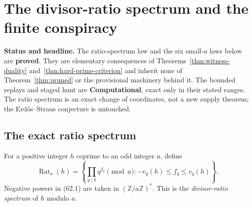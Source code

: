 \documentclass[10pt,reqno]{amsart}
\theoremstyle{definition}
\newcommand{\1}{\mathbf 1}
\begin{document}
\section{The divisor-ratio spectrum and the finite conspiracy}
\label{sec:ratio-spectrum}
\medskip\noindent\textbf{Status and headline.}
The ratio-spectrum law and the six small-$a$ laws below are \textbf{proved}.
They are elementary consequences of Theorems~\ref{thm:witness-duality}
and~\ref{thm:hard-prime-criterion} and inherit none of
Theorem~\ref{thm:pruned} or the provisional machinery behind it.  The
bounded replays and staged hunt are \textbf{Computational}, exact only in
their stated ranges.  The ratio spectrum is an exact change of coordinates,
not a new supply theorem; the Erd\H{o}s--Straus conjecture is untouched.

\subsection{The exact ratio spectrum}
For a positive integer $h$ coprime to an odd integer $a$, define
\begin{equation}\tag{62.1}
 \operatorname {Rat}_a(h)=
 \left\{\prod_{q\mid h}q^{f_q}\pmod a:
                  -v_q(h)\leq f_q\leq v_q(h)\right\}.
\end{equation}
Negative powers in (62.1) are taken in $(\mathbb Z/a\mathbb Z)^*$.  This is
the \emph{divisor-ratio spectrum} of $h$ modulo $a$.
\end{document}
